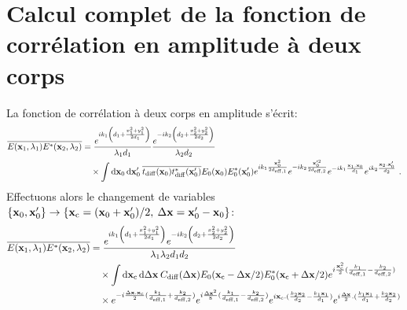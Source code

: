 \section{Calcul complet de la fonction de corrélation en amplitude à deux corps}
La fonction de corrélation à deux corps en amplitude s'écrit:
\begin{align}
\overline{E(\mathbf{x}_1,\lambda_1)E^*(\mathbf{x}_2,\lambda_2)} &= \frac{e^{ik_1 \left( d_1+\frac{x_1^2+y_1^2}{2d_1} \right)}}{\lambda_1 d_1} \frac{e^{-i k_2 \left( d_2+ \frac{x_2^2+y_2^2}{2d_2} \right)}}{\lambda_2 d_2} \\
\nonumber & \quad \times \int{\mathop{}\mathopen{}\mathrm{d}\mathbf{x}_0\mathop{}\mathopen{}\mathrm{d}\mathbf{x}_0' \: \overline{t_{\mathrm{diff}}(\mathbf{x}_0)t_{\mathrm{diff}}^*(\mathbf{x}_0')} E_0(\mathbf{x}_0) E_0^*(\mathbf{x}_0') e^{ik_1\frac{ \mathbf{x}_0^2}{2d_{\mathrm{eff,1}}}} e^{-ik_2\frac{ \mathbf{x}_0'^2}{2d_{\mathrm{eff,2}}}} e^{-ik_1 \frac{\mathbf{x}_1 . \mathbf{x}_0}{d_1}} e^{ik_2 \frac{\mathbf{x}_2 . \mathbf{x}_0'}{d_2}}} \text{ .}
\end{align}
Effectuons alors le changement de variables $\lbrace \mathbf{x}_0,\mathbf{x}_0' \rbrace\rightarrow \lbrace \mathbf{x}_{\mathrm{c}}=(\mathbf{x}_0+\mathbf{x}_0')/2 ,\: \Delta\mathbf{x}=\mathbf{x}_0'-\mathbf{x}_0 \rbrace$:
\begin{align}
\overline{E(\mathbf{x}_1,\lambda_1)E^*(\mathbf{x}_2,\lambda_2)} &= \frac{e^{ik_1\left( d_1 + \frac{x_1^2+y_1^2}{2d_1} \right)} e^{-ik_2 \left( d_2 + \frac{x_2^2+y_2^2}{2d_2}\right)}}{\lambda_1 \lambda_2 d_1 d_2} \\
\nonumber & \quad \times \int{\mathop{}\mathopen{}\mathrm{d}\mathbf{x}_{\mathrm{c}}\mathop{}\mathopen{}\mathrm{d}\Delta\mathbf{x}\: C_{\mathrm{diff}}(\Delta\mathbf{x}) E_0(\mathbf{x}_{\mathrm{c}}-\Delta\mathbf{x}/2)E_0^*(\mathbf{x}_{\mathrm{c}}+\Delta\mathbf{x}/2)} e^{i\frac{\mathbf{x}_{\mathrm{c}}^2}{2} (\frac{k_1}{d_{\mathrm{eff,1}}} - \frac{k_2}{d_{\mathrm{eff,2}}})}\\
\nonumber & \quad \times  e^{-i \frac{\Delta\mathbf{x} . \mathbf{x}_{\mathrm{c}}}{2} ( \frac{k_1}{d_{\mathrm{eff,1}}} + \frac{k_2}{d_{\mathrm{eff,2}}})} e^{i \frac{\Delta\mathbf{x}^2}{8}(\frac{k_1}{d_{\mathrm{eff,1}}} - \frac{k_2}{d_{\mathrm{eff,2}}})} e^{i\mathbf{x}_{\mathrm{c}}.(\frac{k_2 \mathbf{x}_2}{d_2} - \frac{k_1 \mathbf{x}_1}{d_1})} e^{i\frac{\Delta\mathbf{x}}{2} . (\frac{k_1 \mathbf{x}_1}{d_1} + \frac{k_2 \mathbf{x}_2}{d_2})}
\end{align}

